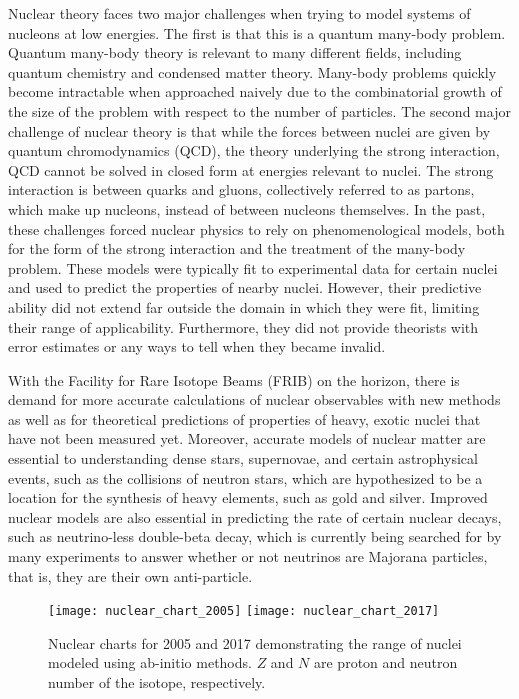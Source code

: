 Nuclear theory faces two major challenges when trying to model systems of nucleons at low energies. The first is that this is a quantum many-body problem. Quantum many-body theory is relevant to many different fields, including quantum chemistry and condensed matter theory. Many-body problems quickly become intractable when approached naively due to the combinatorial growth of the size of the problem with respect to the number of particles. The second major challenge of nuclear theory is that while the forces between nuclei are given by quantum chromodynamics (QCD), the theory underlying the strong interaction, QCD cannot be solved in closed form at energies relevant to nuclei. The strong interaction is between quarks and gluons, collectively referred to as partons, which make up nucleons, instead of between nucleons themselves. In the past, these challenges forced nuclear physics to rely on phenomenological models, both for the form of the strong interaction and the treatment of the many-body problem. These models were typically fit to experimental data for certain nuclei and used to predict the properties of nearby nuclei. However, their predictive ability did not extend far outside the domain in which they were fit, limiting their range of applicability. Furthermore, they did not provide theorists with error estimates or any ways to tell when they became invalid.

With the Facility for Rare Isotope Beams (FRIB) on the horizon, there is demand for more accurate calculations of nuclear observables with new methods as well as for theoretical predictions of properties of heavy, exotic nuclei that have not been measured yet. Moreover, accurate models of nuclear matter are essential to understanding dense stars, supernovae, and certain astrophysical events, such as the collisions of neutron stars, which are hypothesized to be a location for the synthesis of heavy elements, such as gold and silver. Improved nuclear models are also essential in predicting the rate of certain nuclear decays, such as neutrino-less double-beta decay, which is currently being searched for by many experiments to answer whether or not neutrinos are Majorana particles, that is, they are their own anti-particle.

\begin{figure}[t]
    \begin{center}
        \texttt{[image: nuclear\_chart\_2005]}
        \texttt{[image: nuclear\_chart\_2017]}
    \end{center}
    \caption{Nuclear charts for 2005 and 2017 demonstrating the range of nuclei modeled using ab-initio methods. $Z$ and $N$ are proton and neutron number of the isotope, respectively.}
    \label{fig:nuclchart}
\end{figure}

